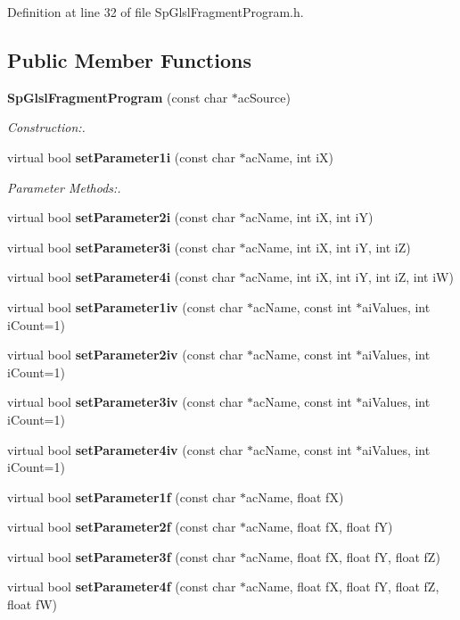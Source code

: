 Definition at line 32 of file Sp\-Glsl\-Fragment\-Program.h.\subsection*{Public Member Functions}
\begin{CompactItemize}
\item 
{\bf Sp\-Glsl\-Fragment\-Program} (const char $\ast$ac\-Source)
\begin{CompactList}\small\item\em Construction:. \item\end{CompactList}\item 
virtual bool {\bf set\-Parameter1i} (const char $\ast$ac\-Name, int i\-X)
\begin{CompactList}\small\item\em Parameter Methods:. \item\end{CompactList}\item 
virtual bool {\bf set\-Parameter2i} (const char $\ast$ac\-Name, int i\-X, int i\-Y)
\item 
virtual bool {\bf set\-Parameter3i} (const char $\ast$ac\-Name, int i\-X, int i\-Y, int i\-Z)
\item 
virtual bool {\bf set\-Parameter4i} (const char $\ast$ac\-Name, int i\-X, int i\-Y, int i\-Z, int i\-W)
\item 
virtual bool {\bf set\-Parameter1iv} (const char $\ast$ac\-Name, const int $\ast$ai\-Values, int i\-Count=1)
\item 
virtual bool {\bf set\-Parameter2iv} (const char $\ast$ac\-Name, const int $\ast$ai\-Values, int i\-Count=1)
\item 
virtual bool {\bf set\-Parameter3iv} (const char $\ast$ac\-Name, const int $\ast$ai\-Values, int i\-Count=1)
\item 
virtual bool {\bf set\-Parameter4iv} (const char $\ast$ac\-Name, const int $\ast$ai\-Values, int i\-Count=1)
\item 
virtual bool {\bf set\-Parameter1f} (const char $\ast$ac\-Name, float f\-X)
\item 
virtual bool {\bf set\-Parameter2f} (const char $\ast$ac\-Name, float f\-X, float f\-Y)
\item 
virtual bool {\bf set\-Parameter3f} (const char $\ast$ac\-Name, float f\-X, float f\-Y, float f\-Z)
\item 
virtual bool {\bf set\-Parameter4f} (const char $\ast$ac\-Name, float f\-X, float f\-Y, float f\-Z, float f\-W)

\end{CompactItemize}
